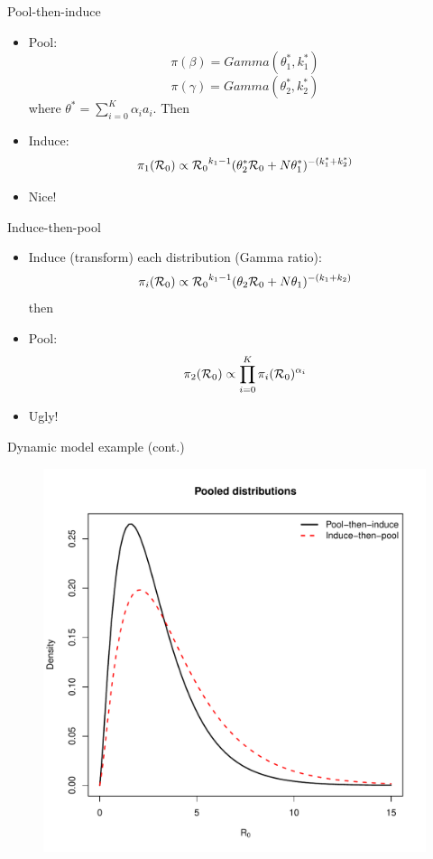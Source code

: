 \begin{frame}{Pool-then-induce}
\begin{itemize}
 \item Pool:
 \[ \pi(\beta) = Gamma(\theta_{1}^*, k_{1}^*) \]
 \[ \pi(\gamma) = Gamma(\theta_{2}^*, k_{2}^*) \]
 where $\theta^* = \sum_{i= 0}^K \alpha_i a_i$. Then
\item Induce:
\[ \pi_{1}({\cal R}_0) \propto  {{\cal R}_0}^{k_1-1} (\theta_{2}^* {\cal R}_0 + N\theta_{1}^*)^{-(k_{1}^* +  k_{2}^*)}\]
\item Nice! 
\end{itemize}
\end{frame}
\begin{frame}{Induce-then-pool}
\begin{itemize}
 \item Induce (transform) each distribution (Gamma ratio):
 \[ \pi_{i}({\cal R}_0) \propto  {{\cal R}_0}^{k_1-1} (\theta_2 {\cal R}_0 + N\theta_1)^{-(k_1 + k_2)} \]
 then
\item Pool:
\[ \pi_{2}({\cal R}_0)  \propto \prod_{i = 0}^K \pi_{i}({\cal R}_0) ^{\alpha_i}\]
\item Ugly!
\end{itemize}
\end{frame}
\begin{frame}{Dynamic model example (cont.)}
 \begin{figure}
 \begin{center}
  \includegraphics[scale=0.4]{figures/ItP_vs_PtI_equalWeights.pdf}
 \end{center}
  \end{figure}
\end{frame}
